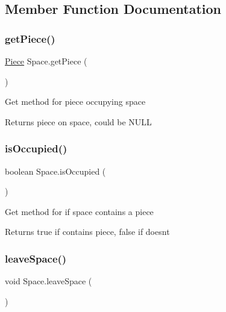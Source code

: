 \subsection{Member Function Documentation}
\mbox{\label{class_space_a6ca21c64ae7fe878d4f574e47d9d28c2}} 
\subsubsection{\texorpdfstring{getPiece()}{getPiece()}}
{\footnotesize\ttfamily \mbox{\hyperlink{class_piece}{Piece}} Space.\+get\+Piece (\begin{DoxyParamCaption}{ }\end{DoxyParamCaption})\hspace{0.3cm}{\ttfamily [inline]}}

Get method for piece occupying space \begin{DoxyReturn}{Returns}
piece on space, could be N\+U\+LL 
\end{DoxyReturn}
\mbox{\label{class_space_acd19ec863f80b21419430fb34e51bf08}} 
\subsubsection{\texorpdfstring{isOccupied()}{isOccupied()}}
{\footnotesize\ttfamily boolean Space.\+is\+Occupied (\begin{DoxyParamCaption}{ }\end{DoxyParamCaption})\hspace{0.3cm}{\ttfamily [inline]}}

Get method for if space contains a piece \begin{DoxyReturn}{Returns}
true if contains piece, false if doesn\textquotesingle{}t 
\end{DoxyReturn}
\mbox{\label{class_space_abdbc9be1450dc19348b7889e8265ee5c}} 
\subsubsection{\texorpdfstring{leaveSpace()}{leaveSpace()}}
{\footnotesize\ttfamily void Space.\+leave\+Space (\begin{DoxyParamCaption}{ }\end{DoxyParamCaption})\hspace{0.3cm}{\ttfamily [inline]}}

